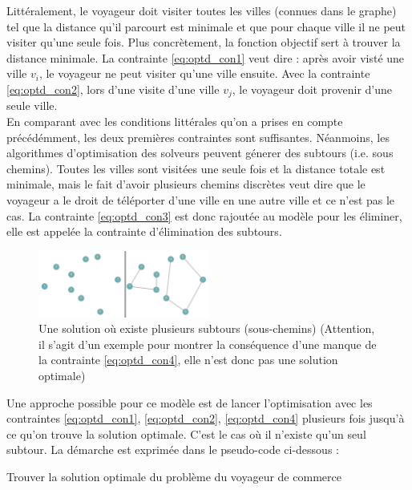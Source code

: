 \documentclass{article}
\begin{document}
Littéralement, le voyageur doit visiter toutes les villes (connues dans le graphe) tel que la distance qu'il parcourt est minimale et que pour chaque ville il ne peut visiter qu'une seule fois. Plus concrètement, la fonction objectif sert à trouver la distance minimale. La contrainte \ref{eq:optd_con1} veut dire : après avoir visté une ville \(v_i\), le voyageur ne peut visiter qu'une ville ensuite. Avec la contrainte \ref{eq:optd_con2}, lors d'une visite d'une ville \(v_j\), le voyageur doit provenir d'une seule ville. \\En comparant avec les conditions littérales qu'on a prises en compte précédémment, les deux premières contraintes sont suffisantes. Néanmoins, les algorithmes d'optimisation des solveurs peuvent génerer des subtours (i.e. sous chemins). Toutes les villes sont visitées une seule fois et la distance totale est minimale, mais le fait d'avoir plusieurs chemins discrètes veut dire que le voyageur a le droit de téléporter d'une ville en une autre ville et ce n'est pas le cas. La contrainte \ref{eq:optd_con3} est donc rajoutée au modèle pour les éliminer, elle est appelée la contrainte d'élimination des subtours.\\

\begin{figure}[h]\centering
\includegraphics[width=0.5\textwidth]{graphe_avec_subtour}
\caption{Une solution où existe plusieurs subtours (sous-chemins) (Attention, il s'agit d'un exemple pour montrer la conséquence d'une manque de la contrainte \ref{eq:optd_con4}, elle n'est donc pas une solution optimale)}

\end{figure}
Une approche possible pour ce modèle est de lancer l'optimisation avec les contraintes \ref{eq:optd_con1}, \ref{eq:optd_con2}, \ref{eq:optd_con4} plusieurs fois jusqu'à ce qu'on trouve la solution optimale. C'est le cas où il n'existe qu'un seul subtour. La démarche est exprimée dans le pseudo-code ci-dessous :\\
\begin{algorithm}[H] 
 \caption{Trouver la solution optimale du problème du voyageur de commerce}
\end{algorithm}
\end{document}
